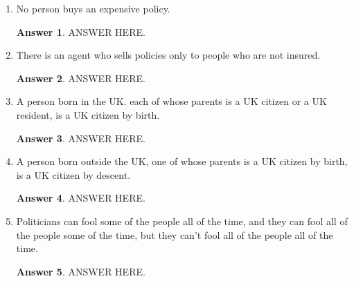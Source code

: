 \documentclass[a4paper]{article}
\renewcommand{\(}{\left(}
\renewcommand{\)}{\right)}
\theoremstyle{plain}
\theoremstyle{plain}
\theoremstyle{definition}
\newtheorem*{answer}{Answer}
\begin{document}
\begin{enumerate}[label*=\alph*.,ref=\alph*]
\item No person buys an expensive policy.
\begin{shaded}
\begin{answer}
ANSWER HERE.
\end{answer}
\end{shaded}

\item There is an agent who sells policies only to people who are not insured.
\begin{shaded}
\begin{answer}
ANSWER HERE.
\end{answer}
\end{shaded}

\item A person born in the UK. each of whose parents is a UK citizen or a UK resident, is a UK citizen by birth.
\begin{shaded}
\begin{answer}
ANSWER HERE.
\end{answer}
\end{shaded}

\item A person born outside the UK, one of whose parents is a UK citizen by birth, is a UK citizen by descent.
\begin{shaded}
\begin{answer}
ANSWER HERE.
\end{answer}
\end{shaded}

\item Politicians can fool some of the people all of the time, and they can fool all of the people some of the time, but they can't fool all of the people all of the time.
\begin{shaded}
\begin{answer}
ANSWER HERE.
\end{answer}
\end{shaded}


\end{enumerate}
\end{document}
